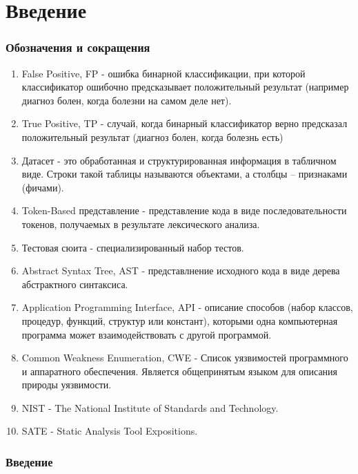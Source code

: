 \chapter{Введение}
\label{sec:Chapter0} 

\subsection*{Обозначения и сокращения}

\begin{enumerate}
    \item False Positive, FP - ошибка бинарной классификации, при которой классификатор ошибочно предсказывает положительный результат (например диагноз болен, когда болезни на самом деле нет).
    \item True Positive, TP - случай, когда бинарный классификатор верно предсказал положительный результат (диагноз болен, когда болезнь есть)
    \item Датасет - это обработанная и структурированная информация в табличном виде. Строки такой таблицы называются объектами, а столбцы – признаками (фичами).
    \item Token-Based представление - представление кода в виде последовательности токенов, получаемых в результате лексического анализа.
    \item Тестовая сюита - специализированный набор тестов.
    \item Abstract Syntax Tree, AST - представлнение исходного кода в виде дерева абстрактного синтаксиса.
    \item Application Programming Interface, API - описание способов (набор классов, процедур, функций, структур или констант), которыми одна компьютерная программа может взаимодействовать с другой программой.
    \item Common Weakness Enumeration, CWE \cite{CWE-doc} - Список уязвимостей программного и аппаратного обеспечения. Является общепринятым языком для описания природы уязвимости.
    \item NIST - The National Institute of Standards and Technology.
    \item SATE - Static Analysis Tool Expositions.
\end{enumerate}

\subsection*{Введение}

